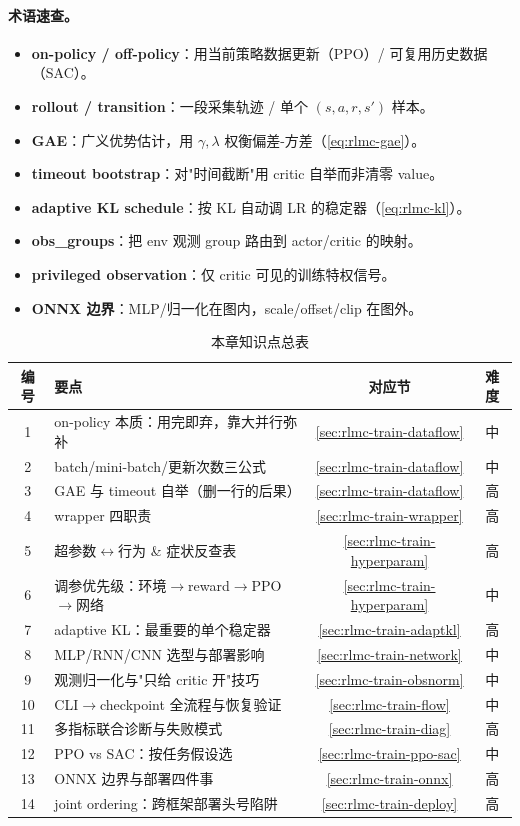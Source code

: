 \paragraph{术语速查。}
\begin{itemize}
  \item \textbf{on-policy / off-policy}：用当前策略数据更新（PPO）/ 可复用历史数据（SAC）。
  \item \textbf{rollout / transition}：一段采集轨迹 / 单个 $(s,a,r,s')$ 样本。
  \item \textbf{GAE}：广义优势估计，用 $\gamma,\lambda$ 权衡偏差-方差（\cref{eq:rlmc-gae}）。
  \item \textbf{timeout bootstrap}：对"时间截断"用 critic 自举而非清零 value。
  \item \textbf{adaptive KL schedule}：按 KL 自动调 LR 的稳定器（\cref{eq:rlmc-kl}）。
  \item \textbf{obs\_groups}：把 env 观测 group 路由到 actor/critic 的映射。
  \item \textbf{privileged observation}：仅 critic 可见的训练特权信号。
  \item \textbf{ONNX 边界}：MLP/归一化在图内，scale/offset/clip 在图外。
\end{itemize}

\begin{table}[H]
\centering
\caption{本章知识点总表}
\label{tab:rlmc-train-knowledge}
\begin{tabular}{clcc}
\hline
编号 & 要点 & 对应节 & 难度 \\
\hline
1 & on-policy 本质：用完即弃，靠大并行弥补 & \cref{sec:rlmc-train-dataflow} & 中 \\
2 & batch/mini-batch/更新次数三公式 & \cref{sec:rlmc-train-dataflow} & 中 \\
3 & GAE 与 timeout 自举（删一行的后果） & \cref{sec:rlmc-train-dataflow} & 高 \\
4 & wrapper 四职责 & \cref{sec:rlmc-train-wrapper} & 高 \\
5 & 超参数$\leftrightarrow$行为 \& 症状反查表 & \cref{sec:rlmc-train-hyperparam} & 高 \\
6 & 调参优先级：环境$\to$reward$\to$PPO$\to$网络 & \cref{sec:rlmc-train-hyperparam} & 中 \\
7 & adaptive KL：最重要的单个稳定器 & \cref{sec:rlmc-train-adaptkl} & 高 \\
8 & MLP/RNN/CNN 选型与部署影响 & \cref{sec:rlmc-train-network} & 中 \\
9 & 观测归一化与"只给 critic 开"技巧 & \cref{sec:rlmc-train-obsnorm} & 中 \\
10 & CLI$\to$checkpoint 全流程与恢复验证 & \cref{sec:rlmc-train-flow} & 中 \\
11 & 多指标联合诊断与失败模式 & \cref{sec:rlmc-train-diag} & 高 \\
12 & PPO vs SAC：按任务假设选 & \cref{sec:rlmc-train-ppo-sac} & 中 \\
13 & ONNX 边界与部署四件事 & \cref{sec:rlmc-train-onnx} & 高 \\
14 & joint ordering：跨框架部署头号陷阱 & \cref{sec:rlmc-train-deploy} & 高 \\
\hline
\end{tabular}
\end{table}

